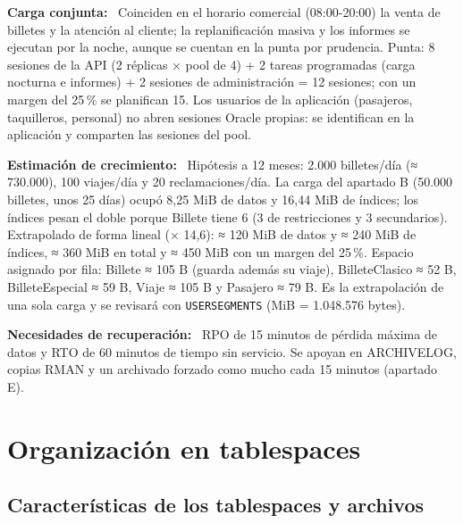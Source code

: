 \documentclass[11pt,a4paper]{article}
\DeclareRobustCommand{\_}{\textunderscore\allowbreak}
\newcommand{\tb}[1]{\texttt{#1}}
\newcommand{\campo}[1]{\textbf{#1:}~}                 %
\begin{document}
\campo{Carga conjunta} Coinciden en el horario comercial (08:00-20:00) la venta de billetes y la atención al cliente; la replanificación masiva y los informes se ejecutan por la noche, aunque se cuentan en la punta por prudencia. Punta: 8 sesiones de la API (2 réplicas × pool de 4) + 2 tareas programadas (carga nocturna e informes) + 2 sesiones de administración = 12 sesiones; con un margen del 25\,\% se planifican 15. Los usuarios de la aplicación (pasajeros, taquilleros, personal) no abren sesiones Oracle propias: se identifican en la aplicación y comparten las sesiones del pool.

\campo{Estimación de crecimiento} Hipótesis a 12 meses: 2.000 billetes/día (≈ 730.000), 100 viajes/día y 20 reclamaciones/día. La carga del apartado B (50.000 billetes, unos 25 días) ocupó 8,25 MiB de datos y 16,44 MiB de índices; los índices pesan el doble porque Billete tiene 6 (3 de restricciones y 3 secundarios). Extrapolado de forma lineal (× 14,6): ≈ 120 MiB de datos y ≈ 240 MiB de índices, ≈ 360 MiB en total y ≈ 450 MiB con un margen del 25\,\%. Espacio asignado por fila: Billete ≈ 105 B (guarda además su viaje), Billete\_Clasico ≈ 52 B, Billete\_Especial ≈ 59 B, Viaje ≈ 105 B y Pasajero ≈ 79 B. Es la extrapolación de una sola carga y se revisará con \tb{USER\_SEGMENTS} (MiB = 1.048.576 bytes).

\campo{Necesidades de recuperación} RPO de 15 minutos de pérdida máxima de datos y RTO de 60 minutos de tiempo sin servicio. Se apoyan en ARCHIVELOG, copias RMAN y un archivado forzado como mucho cada 15 minutos (apartado E).

\section{Organización en tablespaces}
\subsection{Características de los tablespaces y archivos}
\end{document}
